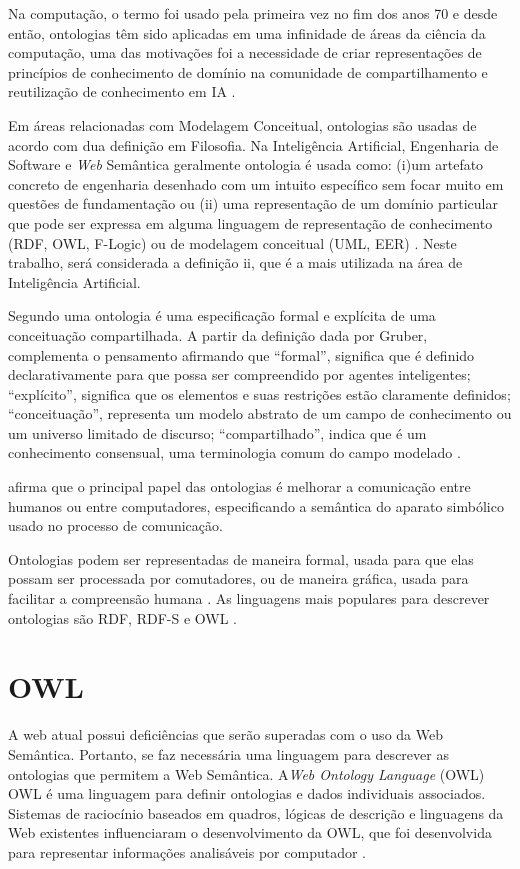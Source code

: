 \documentclass{bcc}
\begin{document}
Na computação, o termo foi usado pela primeira vez no fim dos anos 70 e desde então, ontologias têm sido aplicadas em uma infinidade de áreas da ciência da computação, uma das motivações foi a necessidade de criar representações de princípios de conhecimento de domínio na comunidade de compartilhamento e reutilização de conhecimento em IA \cite{guizzardi2005}.

Em áreas relacionadas com Modelagem Conceitual, ontologias são usadas de acordo com dua definição em Filosofia. Na Inteligência Artificial, Engenharia de Software e \textit{Web} Semântica geralmente ontologia é usada como: (i)um artefato concreto de engenharia desenhado com um intuito específico sem focar muito em questões de fundamentação ou (ii) uma representação de um domínio particular que pode ser expressa em alguma linguagem de representação de conhecimento (RDF, OWL, F-Logic) ou de modelagem conceitual (UML, EER) \cite{guizzardi2008}. Neste trabalho, será considerada a definição ii, que é a mais utilizada na área de Inteligência Artificial.

Segundo \cite{gruber1995} uma ontologia é uma especificação formal e explícita de uma conceituação compartilhada. A partir da definição dada por Gruber, \cite{rocha2014} complementa o pensamento afirmando que “formal”, significa que é definido declarativamente para que possa ser compreendido por agentes inteligentes; “explícito”, significa que os elementos e suas restrições estão claramente definidos; “conceituação”, representa um modelo abstrato de um campo de conhecimento ou um universo limitado de discurso; “compartilhado”, indica que é um conhecimento consensual, uma terminologia comum do campo modelado \cite{rocha2014}.

\cite{lv2011} afirma que o principal papel das ontologias é melhorar a comunicação entre humanos ou entre computadores, especificando a semântica do aparato simbólico usado no processo de comunicação.

Ontologias podem ser representadas de maneira formal, usada para que elas possam ser processada por comutadores, ou de maneira gráfica, usada para facilitar a compreensão humana \cite{isotani2015}. As linguagens mais populares para descrever ontologias são RDF, RDF-S e OWL \cite{mcguinness}.


\section{OWL}

A web atual possui deficiências que serão superadas com o uso da Web Semântica. Portanto, se faz necessária uma linguagem para descrever as ontologias que permitem a Web Semântica. A\textit{Web Ontology Language} (OWL) OWL é uma linguagem para definir ontologias e dados individuais associados. Sistemas de raciocínio baseados em quadros, lógicas de descrição e linguagens da Web existentes influenciaram o desenvolvimento da OWL, que foi desenvolvida para representar informações analisáveis por computador \cite{lacy2005}.
\end{document}
